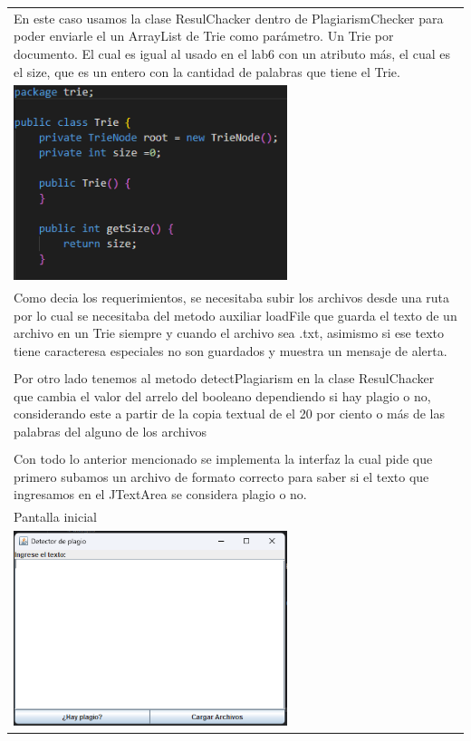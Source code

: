 \documentclass[9pt]{article}
\begin{document}
\begin{longtable}{|p{15cm}|}
		En este caso usamos la clase ResulChacker dentro de PlagiarismChecker para poder enviarle el un ArrayList de Trie como parámetro.
		Un Trie por documento. El cual es igual al usado en el lab6 con un atributo más, el cual es el size,
		que es un entero con la cantidad de palabras que tiene el Trie.
		\\
		\includegraphics[width=8cm]{img/TrieClass.png}\\
		Como decia los requerimientos, se necesitaba subir los archivos desde una ruta
		por lo cual se necesitaba del metodo auxiliar loadFile que guarda el texto de un archivo en un Trie
		siempre y cuando el archivo sea .txt, asimismo si ese texto tiene caracteresa especiales
		no son guardados y muestra un mensaje de alerta. \\
		\\
		Por otro lado tenemos al metodo detectPlagiarism en la clase ResulChacker que cambia
		el valor del arrelo del booleano dependiendo si hay plagio o no, considerando este 
		a partir de la copia textual de el 20 por ciento o más de las palabras del alguno de los archivos \\
		\\
		Con todo lo anterior mencionado se implementa la interfaz la cual pide que primero subamos
		un archivo de formato correcto para saber si el texto que ingresamos en el JTextArea
		se considera plagio o no.\\
		Pantalla inicial\\
		\includegraphics[width=8cm]{img/pantalla-inicial.png}\\

\end{longtable}
\end{document}
